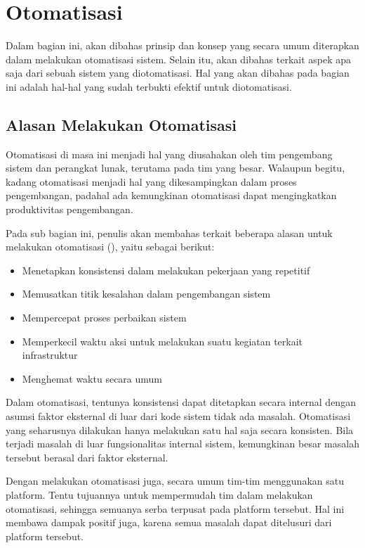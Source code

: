 \section{Otomatisasi}\label{automation}

Dalam bagian ini, akan dibahas prinsip dan konsep yang secara umum diterapkan dalam melakukan otomatisasi sistem.
Selain itu, akan dibahas terkait aspek apa saja dari sebuah sistem yang diotomatisasi.
Hal yang akan dibahas pada bagian ini adalah hal-hal yang sudah terbukti efektif untuk diotomatisasi.

\subsection{Alasan Melakukan Otomatisasi}
Otomatisasi di masa ini menjadi hal yang diusahakan oleh tim pengembang sistem dan perangkat lunak, terutama pada tim yang besar.
Walaupun begitu, kadang otomatisasi menjadi hal yang dikesampingkan dalam proses pengembangan, padahal ada kemungkinan otomatisasi dapat mengingkatkan produktivitas pengembangan.

Pada sub bagian ini, penulis akan membahas terkait beberapa alasan untuk melakukan otomatisasi (\cite{beyer2016site}), yaitu sebagai berikut:

\begin{itemize}
  \item Menetapkan konsistensi dalam melakukan pekerjaan yang repetitif
  \item Memusatkan titik kesalahan dalam pengembangan sistem
  \item Mempercepat proses perbaikan sistem
  \item Memperkecil waktu aksi untuk melakukan suatu kegiatan terkait infrastruktur
  \item Menghemat waktu secara umum
\end{itemize}

Dalam otomatisasi, tentunya konsistensi dapat ditetapkan secara internal dengan asumsi faktor eksternal di luar dari kode sistem tidak ada masalah.
Otomatisasi yang seharusnya dilakukan hanya melakukan satu hal saja secara konsisten.
Bila terjadi masalah di luar fungsionalitas internal sistem, kemungkinan besar masalah tersebut berasal dari faktor eksternal.

Dengan melakukan otomatisasi juga, secara umum tim-tim menggunakan satu platform.
Tentu tujuannya untuk mempermudah tim dalam melakukan otomatisasi, sehingga semuanya serba terpusat pada platform tersebut.
Hal ini membawa dampak positif juga, karena semua masalah dapat ditelusuri dari platform tersebut.

